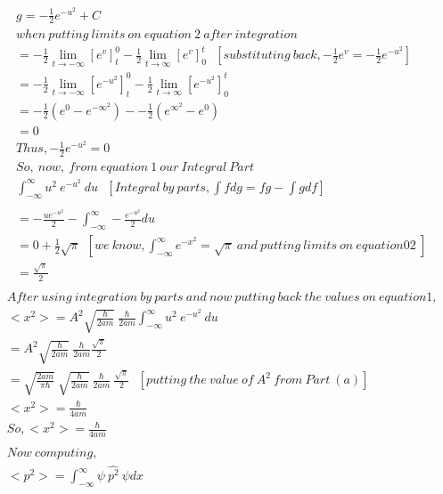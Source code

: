 \documentclass{article}
\begin{document}
\begin{homeworkProblem}
\begin{align*}
  &g =-\frac{1}{2} e^{- u^{2}}+C\\ 
  &when\ putting\ limits\ on\ equation\ 2 \ after\ integration\\
  &=-\frac{1}{2}\lim_{t\to-\infty}[e^{v}]_{t}^{0}-\frac{1}{2}\lim_{t\to\infty}[e^{v}]_{0}^{t}\ \ \ [substituting\ back,-\frac{1}{2} e^v = -\frac{1}{2} e^{- u^{2}}]\\
  &=-\frac{1}{2}\lim_{t\to-\infty}[e^{-u^{2}}]_{t}^{0}-\frac{1}{2}\lim_{t\to\infty}[e^{-u^{2}}]_{0}^{t}\\
  &=-\frac{1}{2}(e^{0} - e^{-\infty^{2}}) --\frac{1}{2}(e^{\infty^{2}} - e^{0})\\
  &=0\\
  &Thus,-\frac{1}{2}e^{- u^{2}} = 0\\
  &So,\ now,\ from\ equation \ 1 \ our\ Integral\ Part \\
  &\int_{-\infty}^{\infty}u^{2}\ e^{-u^{2}} \ du\ \ \ [Integral\ by\ parts,\int f dg = fg - \int gdf]\\\\
  &=-  \frac{ue^{- u^{2}}}{2}- \int_{-\infty}^{\infty} -\frac{e^{- u^{2}}}{2}  du\\
  &=0 + \frac{1}{2} {\sqrt {\pi}} \ \ [we\ know,\int_{-\infty}^{\infty}e^{- x^{2}} =\sqrt {\pi}\ and\ putting \ limits\ on\ equation 02\ ]\\
  &= \frac {\sqrt {\pi}}{2}\\
\end{align*}
\newpage\vspace{5mm}
\hspace{20mm}
\large
\begin{align*}
  &After\ using\ integration\ by\ parts\ and\ now\ putting \ back\ the\ values\ on\ equation 1,\\
  &<x^{2}> =  A^{2}{\sqrt{\frac{\hbar}{2am}}}\ {\frac{\hbar}{2am}} \int_{-\infty}^{\infty}u^{2}\ e^{-u^{2}} \ du\\
  &=A^{2}{\sqrt{\frac{\hbar}{2am}}}\ {\frac{\hbar}{2am}} \frac {\sqrt {\pi}}{2}\\
  &={\sqrt{\frac{2am}{\pi \hbar}}}\ {\sqrt{\frac{\hbar}{2am}}}\ {\frac{\hbar}{2am}}\ \frac {\sqrt {\pi}}{2}\ \  \ [putting \ the\ value\ of \ A^{2}\ from\ Part\ (a)]\\
  &<x^{2}> ={\frac{\hbar}{4am}}\\
  &So,<x^{2}> = {\frac{\hbar}{4am}}\\\\
  &Now\ computing,\\
  &<{p}^{2}> =\int_{-\infty}^{\infty}\psi \ \hat{p^{2}}\ \psi dx\\\\

\end{align*}
\end{homeworkProblem}
\end{document}
